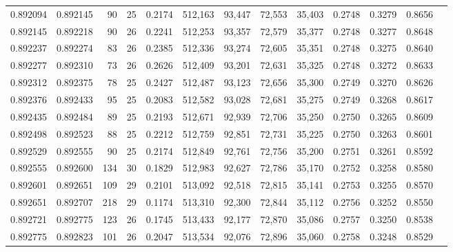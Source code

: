 \begin{tabular}{rrrrrrrrrrrrr}
0.892094 & 0.892145 &    90 &  25 &                                     0.2174 & 512,163 &  93,447 &  72,553 &  35,403 & 0.2748 & 0.3279 & 0.8656 \\
0.892145 & 0.892218 &    90 &  26 &                                     0.2241 & 512,253 &  93,357 &  72,579 &  35,377 & 0.2748 & 0.3277 & 0.8648 \\
0.892237 & 0.892274 &    83 &  26 &                                     0.2385 & 512,336 &  93,274 &  72,605 &  35,351 & 0.2748 & 0.3275 & 0.8640 \\
0.892277 & 0.892310 &    73 &  26 &                                     0.2626 & 512,409 &  93,201 &  72,631 &  35,325 & 0.2748 & 0.3272 & 0.8633 \\
0.892312 & 0.892375 &    78 &  25 &                                     0.2427 & 512,487 &  93,123 &  72,656 &  35,300 & 0.2749 & 0.3270 & 0.8626 \\
0.892376 & 0.892433 &    95 &  25 &                                     0.2083 & 512,582 &  93,028 &  72,681 &  35,275 & 0.2749 & 0.3268 & 0.8617 \\
0.892435 & 0.892484 &    89 &  25 &                                     0.2193 & 512,671 &  92,939 &  72,706 &  35,250 & 0.2750 & 0.3265 & 0.8609 \\
0.892498 & 0.892523 &    88 &  25 &                                     0.2212 & 512,759 &  92,851 &  72,731 &  35,225 & 0.2750 & 0.3263 & 0.8601 \\
0.892529 & 0.892555 &    90 &  25 &                                     0.2174 & 512,849 &  92,761 &  72,756 &  35,200 & 0.2751 & 0.3261 & 0.8592 \\
0.892555 & 0.892600 &   134 &  30 &                                     0.1829 & 512,983 &  92,627 &  72,786 &  35,170 & 0.2752 & 0.3258 & 0.8580 \\
0.892601 & 0.892651 &   109 &  29 &                                     0.2101 & 513,092 &  92,518 &  72,815 &  35,141 & 0.2753 & 0.3255 & 0.8570 \\
0.892651 & 0.892707 &   218 &  29 &                                     0.1174 & 513,310 &  92,300 &  72,844 &  35,112 & 0.2756 & 0.3252 & 0.8550 \\
0.892721 & 0.892775 &   123 &  26 &                                     0.1745 & 513,433 &  92,177 &  72,870 &  35,086 & 0.2757 & 0.3250 & 0.8538 \\
0.892775 & 0.892823 &   101 &  26 &                                     0.2047 & 513,534 &  92,076 &  72,896 &  35,060 & 0.2758 & 0.3248 & 0.8529 \\

\end{tabular}
